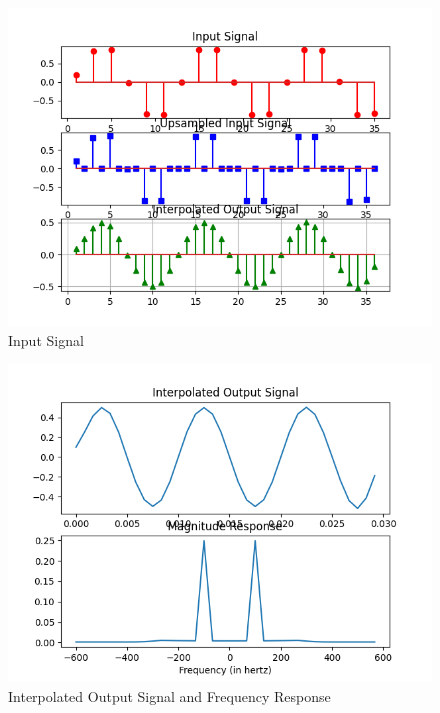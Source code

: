 \documentclass{article}
\begin{document}
\begin{figure}[ht]
  \centering
  \includegraphics[scale=0.8]{./dsp/figs/istem_plots.png}
  \caption{ Input Signal}
  \label{fig:istem_plots}
\end{figure}
\begin{figure}[ht]
  \centering
  \includegraphics[scale=0.8]{./dsp/figs/interpolated_output.png}
  \caption{Interpolated Output Signal and Frequency Response}
  \label{fig:interpolated_output}
\end{figure}
\end{document}

